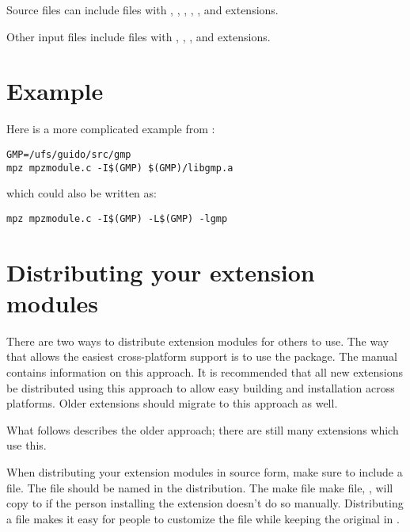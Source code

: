 \documentclass{manual}
\begin{document}
Source files can include files with , , ,
, , and  extensions. 

Other input files include files with , , , 
and  extensions.


\section{Example \label{module-defn-example}}

Here is a more complicated example from :

\begin{verbatim}
GMP=/ufs/guido/src/gmp
mpz mpzmodule.c -I$(GMP) $(GMP)/libgmp.a
\end{verbatim}

which could also be written as:

\begin{verbatim}
mpz mpzmodule.c -I$(GMP) -L$(GMP) -lgmp
\end{verbatim}


\section{Distributing your extension modules
         \label{distributing}}

There are two ways to distribute extension modules for others to use.
The way that allows the easiest cross-platform support is to use the
 package.  The manual
 contains
information on this approach.  It is recommended that all new
extensions be distributed using this approach to allow easy building
and installation across platforms.  Older extensions should migrate to
this approach as well.

What follows describes the older approach; there are still many
extensions which use this.

When distributing your extension modules in source form, make sure to
include a  file.  The  file should be named
 in the distribution.  The make file make file,
, will copy  to  if
the person installing the extension doesn't do so manually.
Distributing a  file makes it easy for people to
customize the  file while keeping the original in
.
\end{document}
